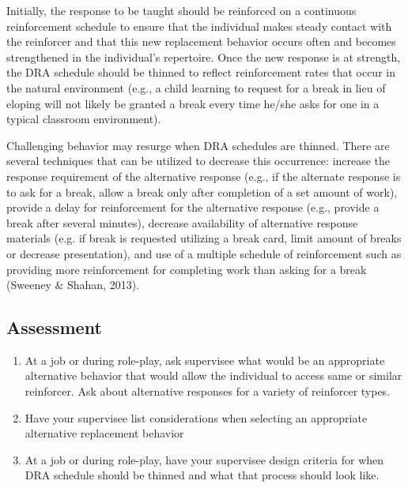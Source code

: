 Initially, the response to be taught should be reinforced on a continuous reinforcement schedule to ensure that the individual makes steady contact with the reinforcer and that this new replacement behavior occurs often and becomes strengthened in the individual's repertoire. Once the new response is at strength, the DRA schedule should be thinned to reflect reinforcement rates that occur in the natural environment (e.g., a child learning to request for a break in lieu of eloping will not likely be granted a break every time he/she asks for one in a typical classroom environment). 

Challenging behavior may resurge when DRA schedules are thinned. There are several techniques that can be utilized to decrease this occurrence: increase the response requirement of the alternative response (e.g., if the alternate response is to ask for a break, allow a break only after completion of a set amount of work), provide a delay for reinforcement for the alternative response (e.g., provide a break after several minutes), decrease availability of alternative response materials (e.g. if break is requested utilizing a break card, limit amount of breaks or decrease presentation), and use of a multiple schedule of reinforcement such as providing more reinforcement for completing work than asking for a break (Sweeney \& Shahan, 2013). 
%
\subsection{Assessment}
\begin{enumerate}
\item At a job or during role-play, ask supervisee what would be an appropriate alternative behavior that would allow the individual to access same or similar reinforcer. Ask about alternative responses for a variety of reinforcer types.
\item Have your supervisee list considerations when selecting an appropriate alternative replacement behavior
\item At a job or during role-play, have your supervisee design criteria for when DRA schedule should be thinned and what that process should look like.
%
\end{enumerate}
%
